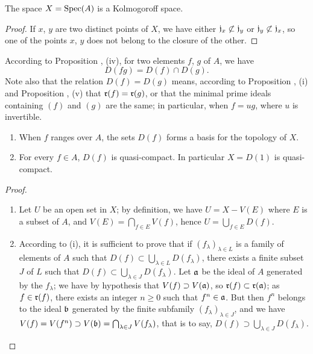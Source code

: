\begin{cor}[1.1.8]
\label{1.1.1.8}
The space $X={\mathop{\mathrm{Spec}}\nolimits}(A)$ is a Kolmogoroff space.
\end{cor}

\begin{proof}
\label{proof-1.1.1.8}
If $x$, $y$ are two distinct points of $X$, we have either
$\mathfrak{j}_x\not\subset\mathfrak{j}_y$ or $\mathfrak{j}_y\not\subset\mathfrak{j}_x$, so
one of the points $x$, $y$ does not belong to the closure of the other.
\end{proof}

\begin{env}[1.1.9]
\label{1.1.1.9}
According to Proposition , (iv), for two elements $f$, $g$ of $A$, we have
\[
  D(fg)=D(f)\cap D(g).
  \tag{1.1.9.1}
\]
Note also that the relation $D(f)=D(g)$ means, according to Proposition
, (i) and Proposition , (v) that $\mathfrak{r}(f)=\mathfrak{r}(g)$, or
that the minimal prime ideals containing $(f)$ and $(g)$ are the same; in particular, when
$f=ug$, where $u$ is invertible.
\end{env}

\begin{prop}[1.1.10]
\label{1.1.1.10}
\medskip\noindent
{}
\begin{enumerate}[label=\emph{(\roman*)}]
  \item When $f$ ranges over $A$, the sets $D(f)$ forms a basis for the topology of $X$.
  \item For every $f\in A$, $D(f)$ is quasi-compact. In particular $X=D(1)$ is quasi-compact.
\end{enumerate}
\end{prop}

\begin{proof}
\label{proof-1.1.1.10}
\medskip\noindent
\begin{enumerate}[label=(\roman*)]
  \item Let $U$ be an open set in $X$; by definition, we have $U=X-V(E)$ where $E$ is a subset of $A$, and $V(E)=\bigcap_{f\in E}V(f)$, hence $U=\bigcup_{f\in E}D(f)$.
  \item According to (i), it is sufficient to prove that if $(f_\lambda)_{\lambda\in L}$ is a family of elements of $A$ such that $D(f)\subset\bigcup_{\lambda\in L}D(f_\lambda)$, there exists a finite subset $J$ of $L$ such that $D(f)\subset\bigcup_{\lambda\in J}D(f_\lambda)$.
    Let $\mathfrak{a}$ be the ideal of $A$ generated by the $f_\lambda$; we have by hypothesis
    that $V(f)\supset V(\mathfrak{a})$, so $\mathfrak{r}(f)\subset\mathfrak{r}(\mathfrak{a})$; as $f\in\mathfrak{r}(f)$,
    there exists an integer $n\geqslant 0$ such that $f^n\in\mathfrak{a}$. But then $f^n$ belongs
    to the ideal $\mathfrak{b}$ generated by the finite subfamily $(f_\lambda)_{\lambda\in J}$,
    and we have $V(f)=V(f^n)\supset V(\mathfrak{b})=\bigcap_{\lambda\in J}V(f_\lambda)$, that is
    to say, $D(f)\supset\bigcup_{\lambda\in J}D(f_\lambda)$.
\end{enumerate}
\end{proof}


